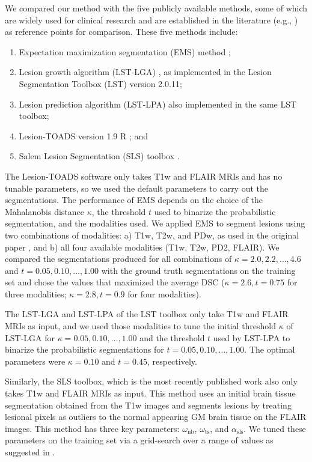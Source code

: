 We compared our method with the five publicly available methods, some of which are widely used
for clinical research and are established in the literature (e.g.,
\cite{sudre2015,subbanna2015,guizard2015}) as reference points for comparison. These five methods include:
\begin{enumerate}
\item Expectation maximization segmentation (EMS) method \cite{vanleemput2001};
\item Lesion growth algorithm (LST-LGA) \cite{schmidt2012automated}, as
implemented in the Lesion Segmentation Toolbox (LST) version 2.0.11;
\item Lesion prediction algorithm (LST-LPA) also implemented in the same LST toolbox;
\item Lesion-TOADS version 1.9 R \cite{shiee2010topology}; and 
\item Salem Lesion Segmentation (SLS) toolbox \cite{roura2015}.
\end{enumerate}
 
The Lesion-TOADS software only takes T1w and FLAIR MRIs and has no tunable
parameters, so we used the default parameters to carry out the segmentations.
The performance of EMS depends on the choice of the Mahalanobis distance
$\kappa$, the threshold $t$ used to binarize the probabilistic segmentation, and
the modalities used. We applied EMS to segment lesions using two combinations of
modalities: a) T1w, T2w, and PDw, as used in the original paper
\cite{vanleemput2001}, and b) all four available modalities (T1w, T2w, PD2,
FLAIR). We compared the segmentations produced for all combinations of $\kappa =
2.0, 2.2, \dotsc, 4.6$ and $t = 0.05, 0.10, \dotsc, 1.00$ with the ground truth
segmentations on the training set and chose the values that maximized the
average DSC ($\kappa = 2.6, t = 0.75$ for three modalities; $\kappa = 2.8, t =
0.9$ for four modalities).

The LST-LGA and LST-LPA of the LST toolbox only take T1w and FLAIR MRIs as
input, and we used those modalities to tune the initial threshold $\kappa$ of
LST-LGA for $\kappa = 0.05, 0.10, \dotsc, 1.00$ and the threshold $t$ used by
LST-LPA to binarize the probabilistic segmentations for $t = 0.05, 0.10, \dotsc,
1.00$. The optimal parameters were $\kappa = 0.10$ and $t = 0.45$, respectively.

Similarly, the SLS toolbox, which is the most recently published work
\cite{roura2015} also only takes T1w and FLAIR MRIs as input. This method uses
an initial brain tissue segmentation obtained from the T1w images and segments
lesions by treating lesional pixels as outliers to the normal appearing GM brain
tissue on the FLAIR images. This method has three key parameters:
$\omega_\text{nb}$, $\omega_\text{ts}$, and $\alpha_\text{sls}$. We tuned these
parameters on the training set via a grid-search over a range of values as
suggested in \cite{roura2015}.


